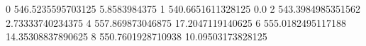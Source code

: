 0 546.5235595703125 5.8583984375
1 540.6651611328125 0.0
2 543.3984985351562 2.73333740234375
4 557.869873046875 17.2047119140625
6 555.0182495117188 14.35308837890625
8 550.7601928710938 10.09503173828125
